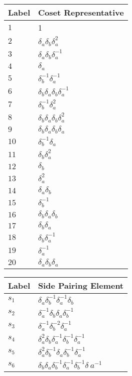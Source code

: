 \documentclass{article}
\begin{document}
\begin{center}
\begin{tabular}{ll}
\toprule
Label & Coset Representative\\
\midrule
$1$ & 1 \\
$2$ & $\delta_a^{}\delta_b^{}\delta_a^{2}$ \\
$3$ & $\delta_a^{}\delta_b^{}\delta_a^{-1}$ \\
$4$ & $\delta_a^{}$ \\
$5$ & $\delta_b^{-1}\delta_a^{-1}$ \\
$6$ & $\delta_b^{}\delta_a^{}\delta_b^{}\delta_a^{-1}$ \\
$7$ & $\delta_b^{-1}\delta_a^{2}$ \\
$8$ & $\delta_b^{}\delta_a^{}\delta_b^{}\delta_a^{2}$ \\
$9$ & $\delta_b^{}\delta_a^{}\delta_b^{}\delta_a^{}$ \\
$10$ & $\delta_b^{-1}\delta_a^{}$ \\
$11$ & $\delta_b^{}\delta_a^{2}$ \\
$12$ & $\delta_b^{}$ \\
$13$ & $\delta_a^{2}$ \\
$14$ & $\delta_a^{}\delta_b^{}$ \\
$15$ & $\delta_b^{-1}$ \\
$16$ & $\delta_b^{}\delta_a^{}\delta_b^{}$ \\
$17$ & $\delta_b^{}\delta_a^{}$ \\
$18$ & $\delta_b^{}\delta_a^{-1}$ \\
$19$ & $\delta_a^{-1}$ \\
$20$ & $\delta_a^{}\delta_b^{}\delta_a^{}$ \\
\bottomrule
\end{tabular}
\hfill
\begin{tabular}{ll}
\toprule
Label & Side Pairing Element\\
\midrule
$s_{1}$ & $\delta_a^{}\delta_b^{-1}\delta_a^{-1}\delta_b^{}$ \\
$s_{2}$ & $\delta_a^{-1}\delta_b^{}\delta_a^{}\delta_b^{-1}$ \\
$s_{3}$ & $\delta_a^{-1}\delta_b^{-2}\delta_a^{-1}$ \\
$s_{4}$ & $\delta_a^{2}\delta_b^{}\delta_a^{-1}\delta_b^{-1}\delta_a^{-1}$ \\
$s_{5}$ & $\delta_a^{2}\delta_b^{-1}\delta_a^{}\delta_b^{-1}\delta_a^{-1}$ \\
$s_{6}$ & $\delta_b^{}\delta_a^{}\delta_b^{-1}\delta_a^{-1}\delta_b^{-1}\delta_\
a^{-1}$ \\

\end{tabular}
\end{center}
\end{document}
